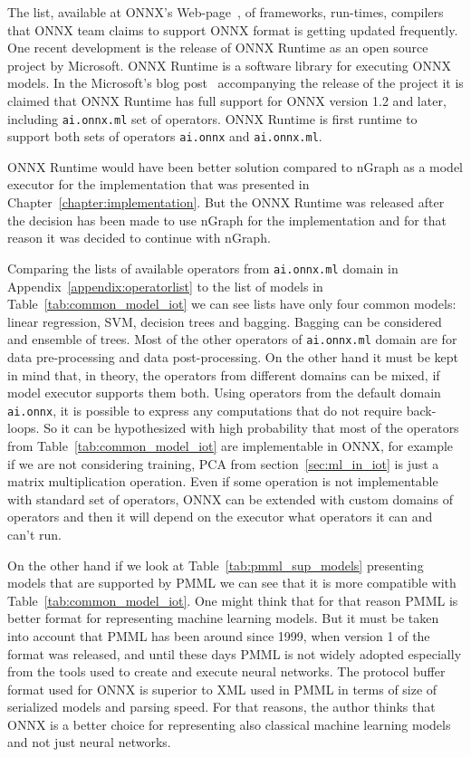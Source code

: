 \documentclass[english, 12pt, a4paper, elec, utf8, online]{aaltothesis}
\begin{document}
The list, available at ONNX's Web-page~\cite{onnx_tools}, of frameworks, run-times, compilers that ONNX team claims to support ONNX format is getting updated frequently. One recent development is the release of ONNX Runtime as an open source project by Microsoft. ONNX Runtime is a software library for executing ONNX models. In the Microsoft's blog post~\cite{onnx_runtime} accompanying the release of the project it is claimed that ONNX Runtime has full support for ONNX version 1.2 and later, including \texttt{ai.onnx.ml} set of operators.
ONNX Runtime is first runtime to support both sets of operators \texttt{ai.onnx} and \texttt{ai.onnx.ml}. 

ONNX Runtime would have been better solution compared to nGraph as a model executor for the implementation that was presented in Chapter~\ref{chapter:implementation}. But the ONNX Runtime was released after the decision has been made to use nGraph for the implementation and for that reason it was decided to continue with nGraph.

Comparing the lists of available operators from \texttt{ai.onnx.ml} domain in Appendix~\ref{appendix:operatorlist} to the list of models in Table~\ref{tab:common_model_iot} we can see lists have only four common models: linear regression, SVM, decision trees and bagging. Bagging can be considered and ensemble of trees. Most of the other operators of \texttt{ai.onnx.ml} domain are for data pre-processing and data post-processing. On the  other hand it must be kept in mind that, in theory, the operators from different domains can be mixed, if model executor supports them both. Using operators from the default domain \texttt{ai.onnx}, it is possible to express any computations that do not require back-loops. So it can be hypothesized with high probability that most of the operators from Table~\ref{tab:common_model_iot} are implementable in ONNX, for example if we are not considering training, PCA from section~\ref{sec:ml_in_iot} is just a matrix multiplication operation. Even if some operation is not implementable with standard set of operators, ONNX can be extended with custom domains of operators and then it will depend on the executor what operators it can and can't run. 

On the other hand if we look at Table~\ref{tab:pmml_sup_models} presenting models that are supported by PMML we can see that it is more compatible with Table~\ref{tab:common_model_iot}. One might think that for that reason PMML is better format for representing machine learning models. But it must be taken into account that PMML has been around since 1999, when version 1 of the format was released, and until these days PMML is not widely adopted especially from the tools used to create and execute neural networks. The protocol buffer format used for ONNX is superior to XML used in PMML in terms of size of serialized models and parsing speed. For that reasons, the author thinks that ONNX is a better choice for representing also classical machine learning models and not just neural networks. 
\end{document}
